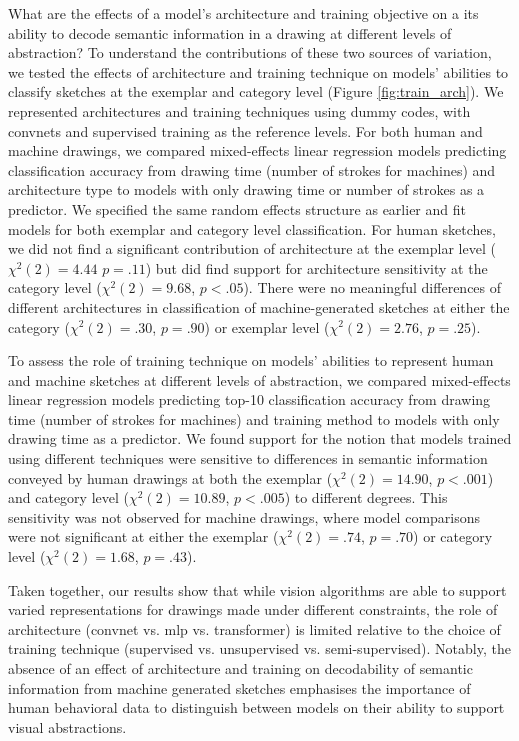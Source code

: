 \documentclass[10pt,letterpaper]{article}
\begin{document}
What are the effects of a model's architecture and training objective on a its ability to decode semantic information in a drawing at different levels of abstraction? 
To understand the contributions of these two sources of variation, we tested the effects of architecture and training technique on models' abilities to classify sketches at the exemplar and category level (Figure \ref{fig:train_arch}).
We represented architectures and training techniques using dummy codes, with convnets and supervised training as the reference levels.
For both human and machine drawings, we compared mixed-effects linear regression models predicting classification accuracy from drawing time (number of strokes for machines) and architecture type to models with only drawing time or number of strokes as a predictor. 
We specified the same random effects structure as earlier and fit models for both exemplar and category level classification.
For human sketches, we did not find a significant contribution of architecture at the exemplar level ($\chi^2(2) = 4.44$ $p = .11$) but did find support for architecture sensitivity at the category level ($\chi^2(2) = 9.68$, $p < .05$).
There were no meaningful differences of different architectures in classification of machine-generated sketches at either the category ($\chi^2(2) = .30$, $p=.90$) or exemplar level ($\chi^2(2) = 2.76$, $p=.25$).

To assess the role of training technique on models' abilities to represent human and machine sketches at different levels of abstraction, we compared mixed-effects linear regression models predicting top-10 classification accuracy from drawing time (number of strokes for machines) and training method to models with only drawing time as a predictor. 
We found support for the notion that models trained using different techniques were sensitive to differences in semantic information conveyed by human drawings at both the exemplar ($\chi^2(2) = 14.90$, $p < .001$) and category level ($\chi^2(2) = 10.89$, $p<.005$) to different degrees.
This sensitivity was not observed for machine drawings, where model comparisons were not significant at either the exemplar ($\chi^2(2) = .74$, $p=.70$) or category level ($\chi^2(2) = 1.68$, $p=.43$).

Taken together, our results show that while vision algorithms are able to support varied representations for drawings made under different constraints, the role of architecture (convnet vs. mlp vs. transformer) is limited relative to the choice of training technique (supervised vs. unsupervised vs. semi-supervised). Notably, the absence of an effect of architecture and training on decodability of semantic information from machine generated sketches emphasises the importance of human behavioral data to distinguish between models on their ability to support visual abstractions.
\end{document}

